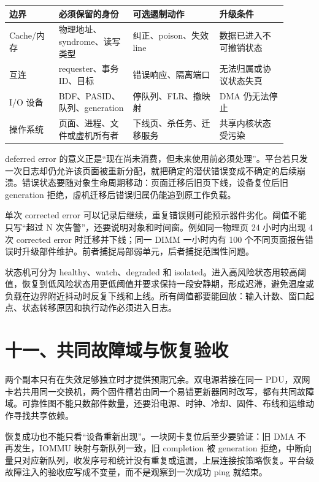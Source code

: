 \begin{longtable}{L{0.16\linewidth}L{0.24\linewidth}L{0.28\linewidth}L{0.22\linewidth}}
\toprule
边界 & 必须保留的身份 & 可选遏制动作 & 升级条件 \\
\midrule
Cache/内存 & 物理地址、syndrome、读写类型 & 纠正、poison、失效 line & 数据已进入不可撤销状态 \\\tablerowrule
互连 & requester、事务 ID、目标 & 错误响应、隔离端口 & 无法归属或协议状态失真 \\\tablerowrule
I/O 设备 & BDF、PASID、队列、generation & 停队列、FLR、撤映射 & DMA 仍无法停止 \\\tablerowrule
操作系统 & 页面、进程、文件或虚机所有者 & 下线页、杀任务、迁移服务 & 共享内核状态受污染 \\
\bottomrule
\end{longtable}

deferred error 的意义正是“现在尚未消费，但未来使用前必须处理”。平台若只发一次日志却仍允许该页面被重新分配，就把确定的潜伏错误变成不确定的后续崩溃。错误状态要随对象生命周期移动：页面迁移后旧页下线，设备复位后旧 generation 拒绝，虚机迁移后错误归属仍能追到原工作负载。


单次 corrected error 可以记录后继续，重复错误则可能预示器件劣化。阈值不能只写“超过 N 次告警”，还要说明对象和时间窗。例如同一物理页 24 小时内出现 4 次 corrected error 时迁移并下线；同一 DIMM 一小时内有 100 个不同页面报告错误时升级部件维护。前者捕捉局部弱单元，后者捕捉范围性问题。

状态机可分为 healthy、watch、degraded 和 isolated。进入高风险状态用较高阈值，恢复到低风险状态用更低阈值并要求保持一段安静期，形成迟滞，避免温度或负载在边界附近抖动时反复下线和上线。所有阈值都要能回放：输入计数、窗口起点、状态转移原因和执行动作必须进入日志。

\section{十一、共同故障域与恢复验收}

两个副本只有在失效足够独立时才提供预期冗余。双电源若接在同一 PDU，双网卡若共用同一交换机，两个固件槽若由同一个易错更新器同时改写，都有共同故障域。可靠性图不能只数部件数量，还要沿电源、时钟、冷却、固件、布线和运维动作寻找共享依赖。

恢复成功也不能只看“设备重新出现”。一块网卡复位后至少要验证：旧 DMA 不再发生，IOMMU 映射与新队列一致，旧 completion 被 generation 拒绝，中断向量只对应新队列，收发序号和统计没有重复或遗漏，上层连接按策略恢复。平台级故障注入的验收应写成不变量，而不是观察到一次成功 ping 就结束。

